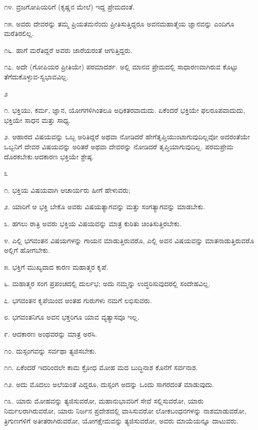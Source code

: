 ೧೪. ವ್ರಜಗೋಪಿಯರಿಗೆ (ಕೃಷ್ಣನ ಮೇಲೆ) ಇದ್ದ ಪ್ರೇಮದಂತೆ.

೧೫. ಅವರು ದೇವರನ್ನು ತಮ್ಮ ಪ್ರಿಯತಮನೆಂದು ಪ್ರೀತಿಸುತ್ತಿದ್ದರೂ ಅವನ\break ಮಹಾತ್ಮೆಯ ಜ್ಞಾನವನ್ನು ಎಂದಿಗೂ ಮರೆತಿರಲಿಲ್ಲ.

೧೬. ಹಾಗೆ ಮರೆತಿದ್ದರೆ ಅವರು ಜಾರೆಯರಂತೆ ಆಗುತ್ತಿದ್ದರು.

೧೭. ಅದೇ (ಗೋಪಿಯರ ಪ್ರೀತಿಯೇ) ಪರಮಾದರ್ಶ. ಅಲ್ಲಿ ಮಾನವ ಪ್ರೇಮದಲ್ಲಿ ಸಾಧಾರಣವಾಗಿರುವ ಕೊಟ್ಟು ತೆಗೆದುಕೊಳ್ಳುವ-ಸ್ವಭಾವವಿಲ್ಲ.

\begin{center}
೨
\end{center}

೧. ಭಕ್ತಿಯು, ಕರ್ಮ, ಜ್ಞಾನ, ಯೋಗಗಳಿಗಿಂತಲೂ ಅಧಿಕತರವಾದುದು. ಏಕೆಂದರೆ ಭಕ್ತಿಯೇ ಫಲರೂಪವಾದುದು, ಭಕ್ತಿಯೇ ಸಾಧನ ಮತ್ತು ಸಾಧ್ಯ.

೨. ಆಹಾರದ ವಿಷಯವನ್ನು ಒಬ್ಬ ಅರಿತಿದ್ದರೆ ಅಥವಾ ನೋಡಿದರೆ ಹೇಗೆ\break ತೃಪ್ತಿಯುಂಟಾಗುವುದಿಲ್ಲವೋ ಅದರಂತೆಯೇ ಒಬ್ಬನಿಗೆ ದೇವರ ವಿಷಯವನ್ನು ಅರಿತರೆ ಅಥವಾ ದೇವರನ್ನು ನೋಡಿದರೆ ತೃಪ್ತಿಯಾಗುವುದಿಲ್ಲ. ಪರಮಪ್ರೇಮ ದೊರಕಬೇಕು.\break ಆದಕಾರಣ ಭಕ್ತಿಯೇ ಶ್ರೇಷ್ಠ.

\begin{center}
೩
\end{center}

೧. ಭಕ್ತಿಯ ವಿಷಯವಾಗಿ ಆಚಾರ್ಯರು ಹೀಗೆ ಹೇಳುವರು;

೨. ಯಾರಿಗೆ ಆ ಭಕ್ತಿ ಬೇಕೊ ಅವರು ವಿಷಯತ್ಯಾಗವನ್ನು ಮತ್ತು ಸಂಗತ್ಯಾಗವನ್ನು ಮಾಡಬೇಕು.

೩. ಹಗಲು ರಾತ್ರಿ ಅವರು ಭಕ್ತಿಯ ವಿಷಯವನ್ನು ಮಾತ್ರ ಕುರಿತು ಚಿಂತಿಸುತ್ತಿರಬೇಕು.

೪. ಎಲ್ಲಿ ಭಗವಂತನ ವಿಷಯಗಳನ್ನು ಗಾಯನ ಮಾಡುತ್ತಿರುವರೊ, ಎಲ್ಲಿ ಅವನ ವಿಷಯವನ್ನು ಮಾತನಾಡುತ್ತಿರುವರೊ ಅಲ್ಲಿಗೆ ಹೋಗಬೇಕು.

೫. ಭಕ್ತಿಗೆ ಮುಖ್ಯವಾದ ಕಾರಣ ಮಹಾತ್ಮರ ಕೃಪೆ.

೬. ಮಹಾತ್ಮರ ಸಂಗ ಪ್ರಪಂಚದಲ್ಲಿ ದುರ್ಲಭ; ಅದು ನಮ್ಮನ್ನು ಉದ್ಧರಿಸುವುದರಲ್ಲಿ ಸಂದೇಹವಿಲ್ಲ.

೭. ಭಗವಂತನ ಕೃಪೆಯಿಂದ ಅಂತಹ ಗುರುಗಳು ನಮಗೆ ಲಭಿಸುವರು.

೮. ಭಗವಂತನಿಗೂ ಅವನ ಭಕ್ತರಿಗೂ ಯಾವ ವ್ಯತ್ಯಾಸವೂ ಇಲ್ಲ.

೯. ಆದಕಾರಣ ಅಂಥವರನ್ನು ಮಾತ್ರ ಅರಸಿ.

೧೦. ದುಸ್ಸಂಗವನ್ನು ಸರ್ವಥಾ ತ್ಯಜಿಸಬೇಕು.

೧೧. ಏಕೆಂದರೆ ಇದರಿಂದಲೇ ಕಾಮ ಕ್ರೋಧ ಮೋಹ ಮದ ಬುದ್ಧಿನಾಶ ಕೊನೆಗೆ ಸರ್ವನಾಶ.

೧೨. ಅದು ಮೊದಲು ಅಲೆಯಂತೆ ಎದ್ದರೂ, ದುಸ್ಸಂಗ ಅದನ್ನು ಒಂದು ಸಾಗರದಂತೆ ಮಾಡುವುದು.

೧೩. ಯಾರು ಮೋಹವನ್ನು ತ್ಯಜಿಸುವರೋ, ಮಹಾನುಭಾವರಿಗೆ ಸೇವೆ ಸಲ್ಲಿಸುವರೋ, ಯಾರು ನಿರ್ಮಲರಾಗಿರುವರೋ, ಯಾರು ನಿರ್ಜನ ಪ್ರದೇಶದಲ್ಲಿ ವಾಸಿಸುವರೋ ಲೋಕಬಂಧನಗಳನ್ನು ನಾಶಮಾಡುವರೋ, ತ್ರಿಗುಣಗಳಿಗೆ ಅತೀತರಾಗಿರುವರೋ, ಯೋಗಕ್ಷೇಮವನ್ನು ತ್ಯಜಿಸುವರೋ, ಅವರು ಮಾಯೆಯನ್ನೂ ದಾಟುವರು.


